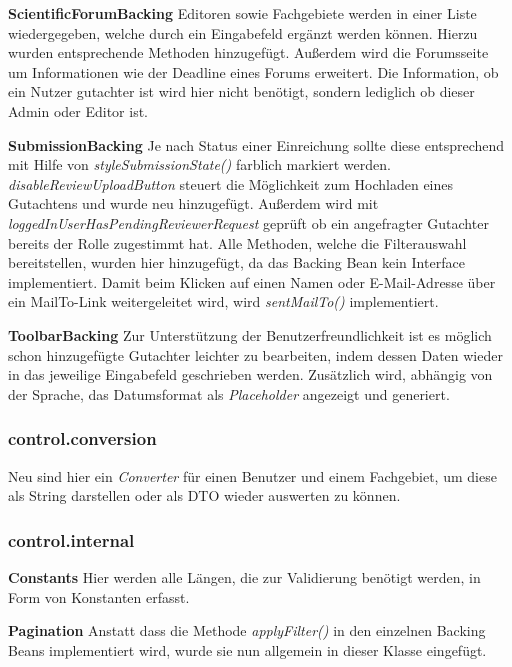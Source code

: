 \textbf{ScientificForumBacking} Editoren sowie Fachgebiete werden in einer Liste wiedergegeben, welche durch ein Eingabefeld ergänzt werden können. Hierzu wurden entsprechende Methoden hinzugefügt. \newline
Außerdem wird die Forumsseite um Informationen wie der Deadline eines Forums erweitert.\newline
Die Information, ob ein Nutzer gutachter ist wird hier nicht benötigt, sondern lediglich ob dieser Admin oder Editor ist.

\textbf{SubmissionBacking} Je nach Status einer Einreichung sollte diese entsprechend mit Hilfe von \emph{styleSubmissionState()} farblich markiert werden. \newline
\emph{disableReviewUploadButton} steuert die Möglichkeit zum Hochladen eines Gutachtens und wurde neu hinzugefügt. Außerdem wird mit  \emph{loggedInUserHasPendingReviewerRequest} geprüft ob ein angefragter Gutachter bereits der Rolle zugestimmt hat. \newline
Alle Methoden, welche die Filterauswahl bereitstellen, wurden hier hinzugefügt, da das Backing Bean kein Interface implementiert.
\newline Damit beim Klicken auf einen Namen oder E-Mail-Adresse über ein MailTo-Link weitergeleitet wird, wird \emph{sentMailTo()} implementiert.

\textbf{ToolbarBacking} Zur Unterstützung der Benutzerfreundlichkeit ist es möglich schon hinzugefügte Gutachter leichter zu bearbeiten, indem dessen Daten wieder in das jeweilige Eingabefeld geschrieben werden. Zusätzlich wird, abhängig von der Sprache, das Datumsformat als \emph{Placeholder} angezeigt und generiert.

\subsubsection{control.conversion}

Neu sind hier ein \emph{Converter} für einen Benutzer und einem Fachgebiet, um diese als String darstellen oder als DTO wieder auswerten zu können.

\subsubsection{control.internal}

\textbf{Constants} Hier werden alle Längen, die zur Validierung benötigt werden, in Form von Konstanten erfasst.

\textbf{Pagination} Anstatt dass die Methode \emph{applyFilter()} in den einzelnen Backing Beans implementiert wird, wurde sie nun allgemein in dieser Klasse eingefügt.

